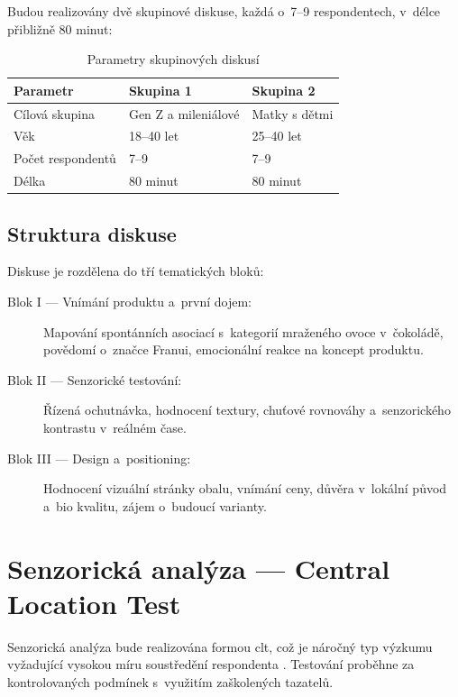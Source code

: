Budou realizovány dvě skupinové diskuse, každá o~7--9 respondentech, v~délce přibližně 80 minut:

\begin{table}[H]
\centering
\caption{Parametry skupinových diskusí}
\label{tab:fgd_params}
\begin{tabular}{lll}
\toprule
\textbf{Parametr} & \textbf{Skupina 1} & \textbf{Skupina 2} \\
\midrule
Cílová skupina & Gen Z a mileniálové & Matky s dětmi \\
Věk & 18--40 let & 25--40 let \\
Počet respondentů & 7--9 & 7--9 \\
Délka & 80 minut & 80 minut \\
\bottomrule
\end{tabular}
\end{table}

\subsection{Struktura diskuse}

Diskuse je rozdělena do tří tematických bloků:

\begin{description}
  \item[Blok I — Vnímání produktu a~první dojem:] Mapování spontánních asociací s~kategorií mraženého ovoce v~čokoládě, povědomí o~značce Franui, emocionální reakce na koncept produktu.
  \item[Blok II — Senzorické testování:] Řízená ochutnávka, hodnocení textury, chuťové rovnováhy a~senzorického kontrastu v~reálném čase.
  \item[Blok III — Design a~positioning:] Hodnocení vizuální stránky obalu, vnímání ceny, důvěra v~lokální původ a~\gls{bio} kvalitu, zájem o~budoucí varianty.
\end{description}

\section{Senzorická analýza — Central Location Test}
\label{sec:meth_clt}

Senzorická analýza bude realizována formou \gls{clt}, což je náročný typ výzkumu vyžadující vysokou míru soustředění respondenta \parencite{lawless_heymann_2010}. Testování proběhne za kontrolovaných podmínek s~využitím zaškolených tazatelů.

